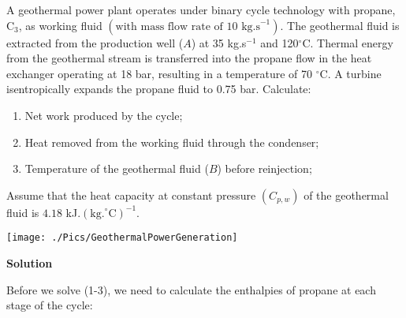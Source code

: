 \documentclass[12pts,a4paper,amsmath,amssymb,floatfix]{article}%
\begin{document}
A geothermal power plant operates under binary cycle technology with propane, C$_{3}$, as working fluid $\left(\text{with mass flow rate of 10 kg.s}^{-1}\right)$. The geothermal fluid is extracted  from the production well ($A$) at 35 kg.s$^{-1}$ and 120$^{\circ}$C. Thermal energy from the geothermal stream is transferred into the propane flow in the heat exchanger operating at 18 bar, resulting in a temperature of 70 $^{\circ}$C. A turbine isentropically expands the propane fluid to 0.75 bar. Calculate:
\begin{enumerate}
  \item Net work produced by the cycle;
  \item Heat removed from the working fluid through the condenser;
  \item Temperature of the geothermal fluid ($B$) before reinjection; 
\end{enumerate}
Assume that the heat capacity at constant pressure $\left(C_{p,w}\right)$ of the geothermal fluid is $4.18$ kJ.$\left(\text{kg.}^{\circ}\text{C}\right)^{-1}$.


\begin{center}
\texttt{[image: ./Pics/GeothermalPowerGeneration]}
\end{center}


\clearpage

\begin{center}
{\large {\bf Solution}}
\end{center}

Before we solve (1-3), we need to calculate the enthalpies of propane at each stage of the cycle:
\end{document}
